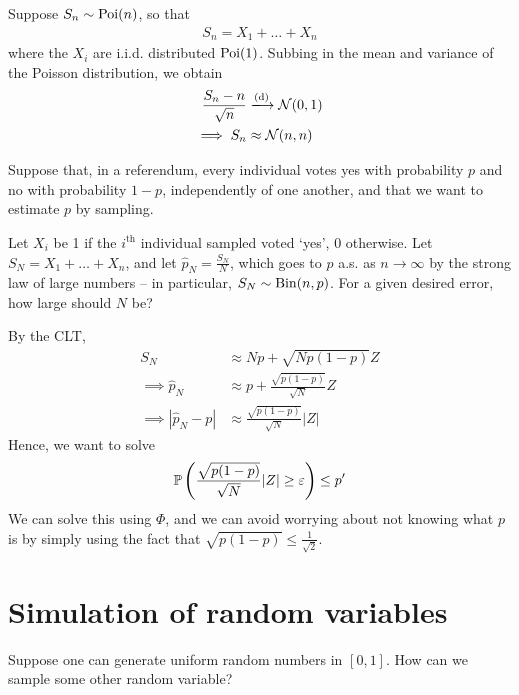 \documentclass{../template/note}
\begin{document}
    \begin{example*}
        Suppose \(S_n \sim \operatorname{Poi}(n)\), so that
        \begin{align*}
            S_n = X_1 + \dots + X_n
        \end{align*}
        where the \(X_i\) are i.i.d. distributed \(\operatorname{Poi}(1)\). Subbing in the mean and variance of the Poisson distribution, we obtain
        \begin{align*}
            \frac{S_n-n}{\sqrt n} &\dto \mc N(0, 1) \\
            \implies S_n &\approx \mc N(n, n)
        \end{align*}
    \end{example*}
    

    Suppose that, in a referendum, every individual votes yes with probability \(p\) and no with probability \(1-p\), independently of one another, and that we want to estimate \(p\) by sampling.

    Let \(X_i\) be 1 if the \(i^\text{th}\) individual sampled voted `yes', 0 otherwise. Let \(S_N = X_1 + \dots + X_n\), and let \(\hat p_N = \frac{S_N}{N}\), which goes to \(p\) a.s. as \(n \to \infty\) by the strong law of large numbers -- in particular, \(S_N \sim \operatorname{Bin}(n, p)\). For a given desired error, how large should \(N\) be?

    By the CLT,
    \begin{align*}
        S_N &\approx Np + \sqrt{Np(1-p)}Z \\
        \implies \hat p_N &\approx p + \frac{\sqrt{p(1-p)}}{\sqrt N} Z \\
        \implies |\hat p_N - p| &\approx \frac{\sqrt{p(1-p)}}{\sqrt N} |Z|
    \end{align*}
    Hence, we want to solve
    \begin{align*}
        \mathbb P\left(\frac{\sqrt{p(1-p)}}{\sqrt N} |Z| \geq \varepsilon\right) \leq p'
    \end{align*}
    We can solve this using \(\Phi\), and we can avoid worrying about not knowing what \(p\) is by simply using the fact that \(\sqrt{p(1-p)} \leq \frac 1 {\sqrt 2}\).

    \section{Simulation of random variables}

    Suppose one can generate uniform random numbers in \([0, 1]\). How can we sample some other random variable?
\end{document}
